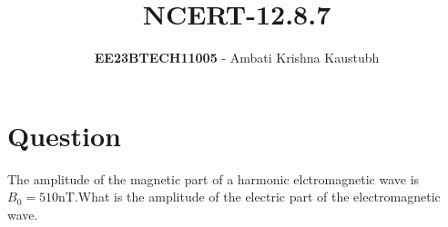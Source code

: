 \documentclass[journal,12pt,twocolumn]{IEEEtran}
\theoremstyle{remark}
\begin{document}
 

\title{NCERT-12.8.7}
\author{\textbf{EE23BTECH11005} - Ambati Krishna Kaustubh%
}
\maketitle
\newpage
\bigskip

\renewcommand{\thefigure}{\arabic{figure}}
\renewcommand{\thetable}{\arabic{table}}
\section*{Question}

The amplitude  of the magnetic part of a harmonic elctromagnetic wave
is $B_0=510$nT.What is the amplitude of the electric part of the electromagnetic wave. 
   
\end{document}
